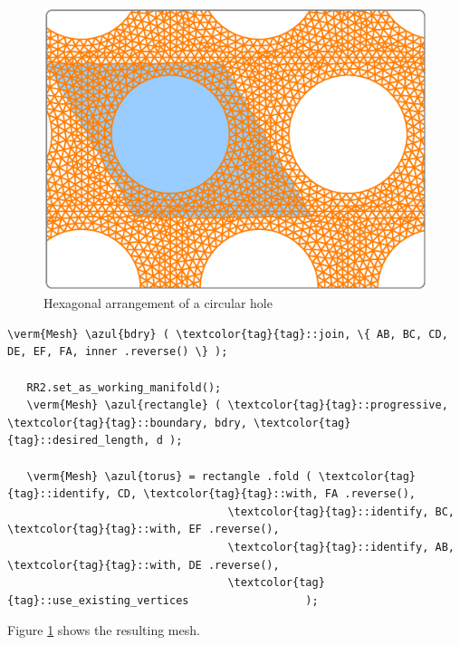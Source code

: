 \begin{figure}[ht] \centering
  \includegraphics[width=115mm]{hexa-round-hole.eps}
  \caption{Hexagonal arrangement of a circular hole}
  \label{\numb section 7.\numb fig 18}
\end{figure}

\begin{Verbatim}[commandchars=\\\{\},formatcom=\small\tt,frame=single,
   label=parag-\ref{\numb section 7.\numb parag 22}.cpp,rulecolor=\color{moldura},
   baselinestretch=0.94,framesep=2mm                                             ]
   \verm{Mesh} \azul{bdry} ( \textcolor{tag}{tag}::join, \{ AB, BC, CD, DE, EF, FA, inner .reverse() \} );

   RR2.set_as_working_manifold();
   \verm{Mesh} \azul{rectangle} ( \textcolor{tag}{tag}::progressive, \textcolor{tag}{tag}::boundary, bdry, \textcolor{tag}{tag}::desired_length, d );

   \verm{Mesh} \azul{torus} = rectangle .fold ( \textcolor{tag}{tag}::identify, CD, \textcolor{tag}{tag}::with, FA .reverse(),
                                  \textcolor{tag}{tag}::identify, BC, \textcolor{tag}{tag}::with, EF .reverse(),
                                  \textcolor{tag}{tag}::identify, AB, \textcolor{tag}{tag}::with, DE .reverse(),
                                  \textcolor{tag}{tag}::use_existing_vertices                  );
\end{Verbatim}

Figure \ref{\numb section 7.\numb fig 18} shows the resulting mesh.
\vfil\eject


